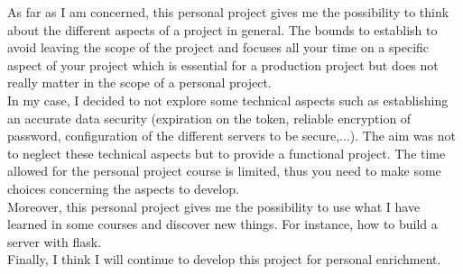 As far as I am concerned, this personal project gives me the possibility to think about the different aspects of a project in general. The bounds to establish to avoid leaving the scope of the project and focuses all your time on a specific aspect of your project which is essential for a production project but does not really matter in the scope of a personal project.\\

In my case, I decided to not explore some technical aspects such as establishing an accurate data security (expiration on the token, reliable encryption of password, configuration of the different servers to be secure,...). The aim was not to neglect these technical aspects but to provide a functional project. The time allowed for the personal project course is limited, thus you need to make some choices concerning the aspects to develop.\\

Moreover, this personal project gives me the possibility to use what I have learned in some courses and discover new things. For instance, how to build a server with flask.\\

Finally, I think I will continue to develop this project for personal enrichment.